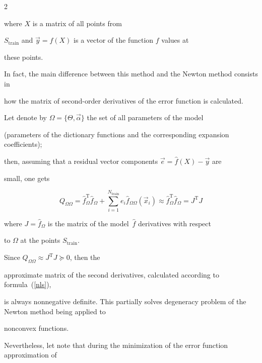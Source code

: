 \begin{multicols}{2}
 



 

 \noindent

 where $X$ is a matrix of all points from 

 $S_{\mathrm{train}}$ and $\vec y = f(X)$ is a vector of the function $f$ values at 

 these points.  

In fact, the main difference between this method and the Newton method consists in

how the matrix of second-order derivatives of the error function is calculated.

Let denote by $\Omega = \{\Theta,\vec \alpha\}$ the set of all parameters of the model

 (parameters of the dictionary functions and the corresponding expansion coefficients); 

 then, assuming that a residual vector components $\vec e = \hat f({ X}) - \vec y$ are 

 small, one gets

\begin{equation}

  \label{nls}

  Q_{\Omega \Omega} = \hat f_{\Omega}^{\mathrm{T}} \hat f_{\Omega} + 

  \sum\limits_{i=1}^{N_{\mathrm{train}}} e_i \hat f_{\Omega \Omega} 

  \left(\vec x_i\right) \approx \hat f_{\Omega}^{\mathrm{T}} 

  \hat f_{\Omega} = {J}^{\mathrm{T}} { J}

\end{equation}

where ${J} = \hat f_{\Omega}$ is the matrix of the model~$\hat f$ derivatives with respect 

to $\Omega$ at the points $S_{\mathrm{train}}$.

Since $Q_{\Omega \Omega} \approx { J}^{\mathrm{T}} { J} \succeq 0$, then the 

approximate matrix of the second derivatives, calculated according to formula~(\ref{nls}), 

is always nonnegative definite. This partially solves degeneracy problem of the Newton method being applied to 

nonconvex functions.



Nevertheless, let note that during the minimization of the error function approximation of 


\end{multicols}
